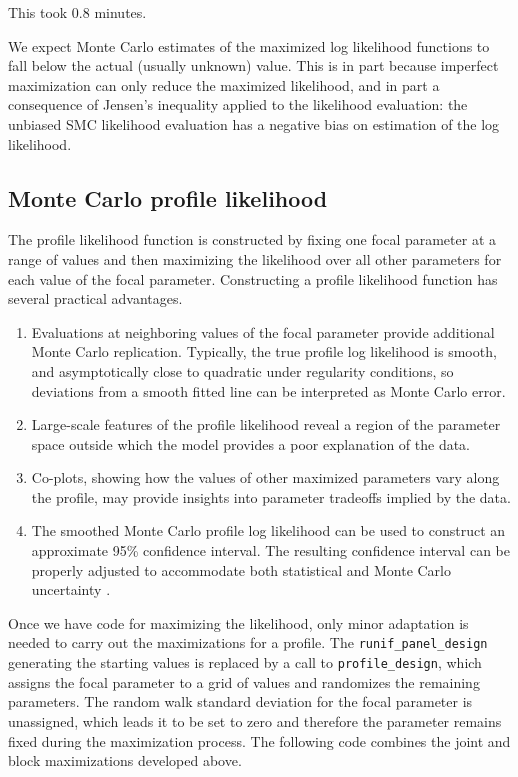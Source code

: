 \documentclass[12pt]{article}\usepackage[]{graphicx}\usepackage[table]{xcolor}
\newcommand\code{\texttt}
\begin{document}
This took 0.8 minutes.

We expect Monte Carlo estimates of the maximized log likelihood functions to fall below the actual (usually unknown) value.
This is in part because imperfect maximization can only reduce the maximized likelihood, and in part a consequence of Jensen's inequality applied to the likelihood evaluation: the unbiased SMC likelihood evaluation has a negative bias on estimation of the log likelihood.

\subsection{Monte Carlo profile likelihood}

The profile likelihood function is constructed by fixing one focal parameter at a range of values and then maximizing the likelihood over all other parameters for each value of the focal parameter.
Constructing a profile likelihood function has several practical advantages.
\begin{enumerate}
\item Evaluations at neighboring values of the focal parameter provide additional Monte Carlo replication. Typically, the true profile log likelihood is smooth, and asymptotically close to quadratic under regularity conditions, so deviations from a smooth fitted line can be interpreted as Monte Carlo error.
\item Large-scale features of the profile likelihood reveal a region of the parameter space outside which the model provides a poor explanation of the data.
\item Co-plots, showing how the values of other maximized parameters vary along the profile, may provide insights into parameter tradeoffs implied by the data.
\item The smoothed Monte Carlo profile log likelihood can be used to construct an approximate 95\% confidence interval.
The resulting confidence interval can be properly adjusted to accommodate both statistical and Monte Carlo uncertainty \citep{ionides17}.
\end{enumerate}

Once we have code for maximizing the likelihood, only minor adaptation is needed to carry out the maximizations for a profile.
The \code{runif\_panel\_design} generating the starting values is replaced by a call to \code{profile\_design}, which assigns the focal parameter to a grid of values and randomizes the remaining parameters.
The random walk standard deviation for the focal parameter is unassigned, which leads it to be set to zero and therefore the parameter remains fixed during the maximization process.
The following code combines the joint and block maximizations developed above.
\end{document}
